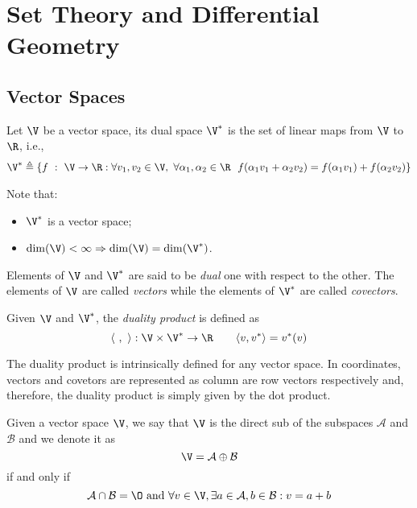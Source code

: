 \chapter{Set Theory and Differential Geometry}
%
\section{Vector Spaces}\label{vectorspaces}
%
\begin{defn}
	Let $\V$ be a vector space, its dual space $\V^*$ is the set of linear maps from $\V$ to $\R$, i.e.,
	\begin{align}
	\V^* \triangleq \left\{f~:~\V\rightarrow\R:\forall v_1,v_2\in\V,~\forall\alpha_1,\alpha_2\in\R~~f(\alpha_1v_1+\alpha_2v_2) = f(\alpha_1v_1)+f(\alpha_2v_2)\right\}
	\end{align}
\end{defn}
%
Note that:
%
\begin{itemize}
    \item $\V^*$ is a vector space;
    \item $\dim(\V)<\infty\Rightarrow\dim(\V)= \dim(\V^*)$.
\end{itemize}
%
Elements of $\V$ and $\V^*$ are said to be \textit{dual} one with respect to the other. The elements of $\V$ are called \textit{vectors} while the elements of $\V^*$ are called \textit{covectors}.
%
\begin{defn}
	Given $\V$ and $\V^*$, the \textit{duality product} is defined as
	\begin{equation}
	\langle\text{ },\text{ }\rangle:\V\times\V^*\rightarrow\R\qquad\langle v,v^*\rangle = v^*(v)
	\end{equation}
\end{defn}
%
The duality product is intrinsically defined for any vector space. In coordinates, vectors and covetors are represented as column are row vectors respectively and, therefore, the duality product is simply given by the dot product.
%
\begin{defn}
	Given a vector space $\V$, we say that $\V$ is the direct sub of the subspaces $\mathcal{A}$ and $\mathcal{B}$ and we denote it as
	\begin{equation*}
	\V = \mathcal{A}\oplus\mathcal{B}
	\end{equation*}
	if and only if
	\begin{equation*}
	\mathcal{A}\cap\mathcal{B} = \O\text{ and } \forall v\in\V,\exists a\in\mathcal{A},b\in\mathcal{B}:v= a+b
	\end{equation*}
\end{defn}
%
